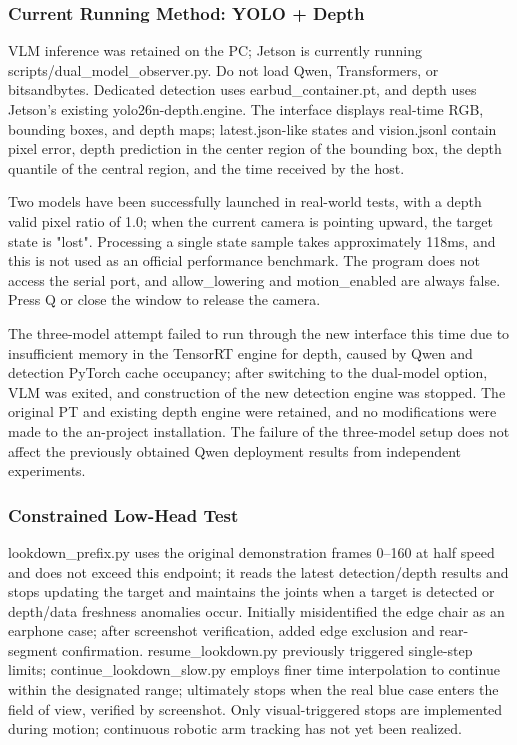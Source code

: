 \subsubsection{Current Running Method: YOLO + Depth}\label{s06-detail-9}

VLM inference was retained on the PC; Jetson is currently running scripts/dual\_\allowbreak model\_\allowbreak observer.py. Do not load Qwen, Transformers, or bitsandbytes. Dedicated detection uses earbud\_container.pt, and depth uses Jetson's existing yolo26n-depth.engine. The interface displays real-time RGB, bounding boxes, and depth maps; latest.json-like states and vision.jsonl contain pixel error, depth prediction in the center region of the bounding box, the depth quantile of the central region, and the time received by the host.

Two models have been successfully launched in real-world tests, with a depth valid pixel ratio of 1.0; when the current camera is pointing upward, the target state is "lost". Processing a single state sample takes approximately 118ms, and this is not used as an official performance benchmark. The program does not access the serial port, and allow\_lowering and motion\_enabled are always false. Press Q or close the window to release the camera.

The three-model attempt failed to run through the new interface this time due to insufficient memory in the TensorRT engine for depth, caused by Qwen and detection PyTorch cache occupancy; after switching to the dual-model option, VLM was exited, and construction of the new detection engine was stopped. The original PT and existing depth engine were retained, and no modifications were made to the an-project installation. The failure of the three-model setup does not affect the previously obtained Qwen deployment results from independent experiments.

\subsubsection{Constrained Low-Head Test}\label{s06-detail-10}

lookdown\_prefix.py uses the original demonstration frames 0--160 at half speed and does not exceed this endpoint; it reads the latest detection/depth results and stops updating the target and maintains the joints when a target is detected or depth/data freshness anomalies occur. Initially misidentified the edge chair as an earphone case; after screenshot verification, added edge exclusion and rear-segment confirmation. resume\_lookdown.py previously triggered single-step limits; continue\_lookdown\_slow.py employs finer time interpolation to continue within the designated range; ultimately stops when the real blue case enters the field of view, verified by screenshot. Only visual-triggered stops are implemented during motion; continuous robotic arm tracking has not yet been realized.

